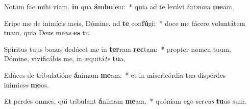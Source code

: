 \item Notam fac mihi viam, \textbf{in} qua \textbf{ám}\textbf{bu}lem:~* quia ad te levávi áni\textit{mam} \textbf{me}am.
\item Eripe me de inimícis meis, Dómine, ad \textbf{te} con\textbf{fú}gi:~* doce me fácere voluntátem tuam, quia Deus me\textit{us} \textbf{es} tu.
\item Spíritus tuus bonus dedúcet me in \textbf{ter}ram \textbf{rec}tam:~* propter nomen tuum, Dómine, vivificábis me, in æquitá\textit{te} \textbf{tu}a.
\item Edúces de tribulatióne \textbf{á}nimam \textbf{me}am:~* et in misericórdia tua dispérdes inimí\textit{cos} \textbf{me}os.
\item Et perdes omnes, qui tríbulant \textbf{á}nimam \textbf{me}am,~* quóniam ego ser\textit{vus} \textbf{tu}us sum.
